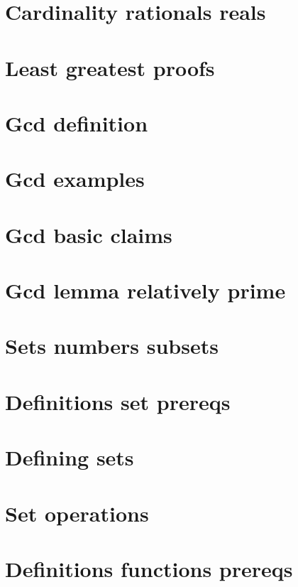 
\section*{Cardinality rationals reals}

\vfill
\section*{Least greatest proofs}

\vfill
\section*{Gcd definition}

\vfill
\section*{Gcd examples}

\vfill
\section*{Gcd basic claims}

\vfill
\section*{Gcd lemma relatively prime}

\vfill
\section*{Sets numbers subsets}

\vfill
\section*{Definitions set prereqs}

\vfill
\section*{Defining sets}

\vfill
\section*{Set operations}

\vfill
\section*{Definitions functions prereqs}

\vfill
